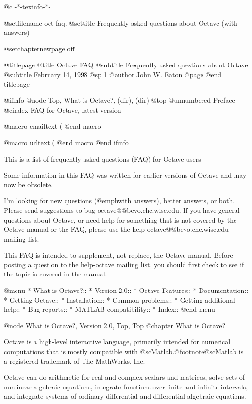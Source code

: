       @c -*-texinfo-*-

@setfilename oct-faq.
@settitle Frequently asked questions about Octave (with answers)

@setchapternewpage off

@titlepage
@title Octave FAQ
@subtitle Frequently asked questions about Octave
@subtitle February 14, 1998
@sp 1
@author John W. Eaton
@page
@end titlepage

@ifinfo
@node Top, What is Octave?, (dir), (dir)
@top
@unnumbered Preface
@cindex FAQ for Octave, latest version

@macro email{text}
(\text\)
@end macro

@macro url{text}
(\text\)
@end macro
@end ifinfo

This is a list of frequently asked questions (FAQ) for Octave users.

Some information in this FAQ was written for earlier versions of
Octave and may now be obsolete.

I'm looking for new questions (@emph{with} answers), better answers,
or both.  Please send suggestions to bug-octave@@bevo.che.wisc.edu.
If you have general questions about Octave, or need help for something
that is not covered by the Octave manual or the FAQ, please use the
help-octave@@bevo.che.wisc.edu mailing list.

This FAQ is intended to supplement, not replace, the Octave manual.
Before posting a question to the help-octave mailing list, you should
first check to see if the topic is covered in the manual.

@menu
* What is Octave?::             
* Version 2.0::               
* Octave Features::             
* Documentation::               
* Getting Octave::              
* Installation::                
* Common problems::             
* Getting additional help::     
* Bug reports::                 
* MATLAB compatibility::        
* Index::                       
@end menu

@node What is Octave?, Version 2.0, Top, Top
@chapter What is Octave?

Octave is a high-level interactive language, primarily intended for
numerical computations that is mostly compatible with
@sc{Matlab}.@footnote{@sc{Matlab} is a registered trademark of The MathWorks,
Inc.}

Octave can do arithmetic for real and complex scalars and matrices,
solve sets of nonlinear algebraic equations, integrate functions over
finite and infinite intervals, and integrate systems of ordinary
differential and differential-algebraic equations.

